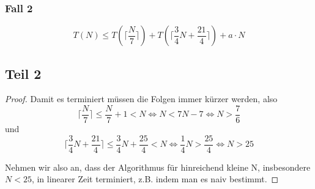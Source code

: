 \documentclass[10pt,a4paper]{article}
\begin{document}
\subsubsection{Fall 2}
\begin{equation}
  T(N) \le T(\lceil \frac{N}{7} \rceil) + T(\lceil \frac{3}{4}N + \frac{21}{4} \rceil) + a \cdot N
\end{equation}

\subsection{Teil 2}
\begin{proof}
  Damit es terminiert müssen die Folgen immer kürzer werden, also
  \begin{equation}
    \lceil \frac{N}{7} \rceil \le \frac{N}{7} + 1 < N \Leftrightarrow N < 7N - 7 \Leftrightarrow N > \frac{7}{6}
  \end{equation}
  und
  \begin{equation}
    \lceil \frac{3}{4}N + \frac{21}{4} \rceil \le \frac{3}{4}N + \frac{25}{4} < N \Leftrightarrow \frac{1}{4}N > \frac{25}{4} \Leftrightarrow N > 25
  \end{equation}

  Nehmen wir also an, dass der Algorithmus für hinreichend kleine N, insbesondere $N < 25$, in linearer Zeit terminiert, z.B. indem man es naiv bestimmt.


\end{proof}
\end{document}
